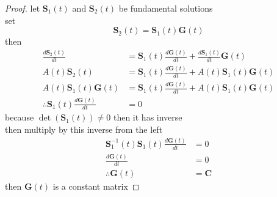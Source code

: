 \documentclass[]{article}
\begin{document}
\begin{proof}[Proof]
    let $\mathbf{S}_1(t)$ and $\mathbf{S}_2(t)$ be fundamental solutions
    \\
    set 
    \[
        \mathbf{S}_2(t) = \mathbf{S}_1(t)\mathbf{G}(t)
    \]
    then 
    \begin{align*}
        \frac{d\mathbf{S}_2(t)}{dt} &= \mathbf{S}_1(t)\frac{d\mathbf{G}(t)}{dt} + \frac{d\mathbf{S}_1(t)}{dt}\mathbf{G}(t)
        \\
        A(t)\mathbf{S}_2(t) &= \mathbf{S}_1(t)\frac{d\mathbf{G}(t)}{dt} + A(t)\mathbf{S}_1(t)\mathbf{G}(t)
        \\
        A(t)\mathbf{S}_1(t)\mathbf{G}(t) &= \mathbf{S}_1(t)\frac{d\mathbf{G}(t)}{dt} + A(t)\mathbf{S}_1(t)\mathbf{G}(t)
        \\
\therefore \mathbf{S}_1(t)\frac{d\mathbf{G}(t)}{dt} &= 0
    \end{align*}
because $\det(\mathbf{S}_1(t))\neq 0$ then it has inverse 
\\
then multiply by this inverse from the left
\begin{align*}
    \mathbf{S}_1^{-1}(t)\mathbf{S}_1(t)\frac{d\mathbf{G}(t)}{dt} &= 0
    \\
    \frac{d\mathbf{G}(t)}{dt} &= 0
    \\
    \therefore \mathbf{G}(t) &= \mathbf{C}
\end{align*}
then $\mathbf{G}(t)$ is a constant matrix
\end{proof}
\end{document}
